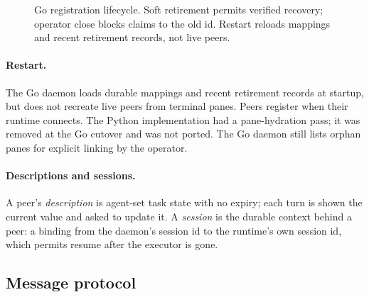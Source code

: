 \documentclass[10pt,twocolumn]{article}
\begin{document}
\begin{figure}[t]
\centering
{}
\caption{Go registration lifecycle. Soft retirement permits verified recovery; operator close blocks claims to the old id. Restart reloads mappings and recent retirement records, not live peers.}
\label{fig:lifecycle}
\end{figure}

\paragraph{Restart.}
The Go daemon loads durable mappings and recent retirement records at startup, but does not recreate live peers from terminal panes. Peers register when their runtime connects. The Python implementation had a pane-hydration pass; it was removed at the Go cutover and was not ported. The Go daemon still lists orphan panes for explicit linking by the operator.

\paragraph{Descriptions and sessions.}
A peer's \emph{description} is agent-set task state with no expiry; each turn is shown the current value and asked to update it. A \emph{session} is the durable context behind a peer: a binding from the daemon's session id to the runtime's own session id, which permits resume after the executor is gone.

\subsection{Message protocol}
\label{sec:protocol}
\end{document}
